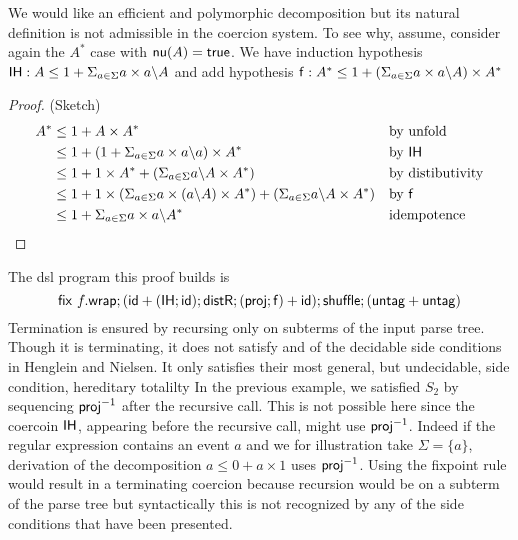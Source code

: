 We would like an efficient and polymorphic decomposition but its natural definition is not admissible in the coercion system. To see why, assume, consider again the $A^*$ case with $\mathsf{nu}(A) = \mathsf{true}$. We have induction hypothesis $\mathsf{IH} : A \leq 1 + \Sigma_{a \in \Sigma} a\times a \backslash A$ and add hypothesis $\mathsf{f} : A^* \leq 1 + (\Sigma_{a \in \Sigma} a\times a \backslash A) \times A^*$
\begin{proof} (Sketch)
\begin{align}
A^* &\leq  1 + A \times A^* && \text{by unfold}\\
 &\leq 1 + (1 + \Sigma_{a \in \Sigma} a\times a \backslash a) \times A^* && \text{by } \mathsf{IH}\\
 &\leq 1 + 1 \times A^* + (\Sigma_{a \in \Sigma} a \backslash A \times A^*) && \text{by distibutivity}\\
 &\leq 1 +  1 \times (\Sigma_{a \in \Sigma} a\times (a \backslash A)\times A^*) +  (\Sigma_{a \in \Sigma} a \backslash A \times A^*)  && \text{by } \mathsf{f}  \\
 &\leq 1 + \Sigma_{a \in \Sigma} a\times a \backslash A^* && \text{idempotence} 
\end{align}
\end{proof}
The dsl program this proof builds is 
\[ \mathsf{fix} ~f.\mathsf{wrap};(\mathsf{id} + (\mathsf{IH};\mathsf{id});\mathsf{distR};(\mathsf{proj};\mathsf{f})+\mathsf{id});\mathsf{shuffle};(\mathsf{untag} + \mathsf{untag}) \]
Termination is ensured by recursing only on subterms of the input parse tree. Though it is terminating, it does not satisfy and of the decidable side conditions in Henglein and Nielsen. It only satisfies their most general, but undecidable, side condition, hereditary totalilty
In the previous example, we satisfied $S_2$ by sequencing $\mathsf{proj}^{-1}$ after the recursive call. This is not possible here since the coercoin $\mathsf{IH}$, appearing before the recursive call, might use $\mathsf{proj}^{-1}$. Indeed if the regular expression contains an event $a$ and we for illustration take $\Sigma = \{a\}$, derivation of the decomposition $a \leq 0 + a \times 1 $ uses $\mathsf{proj}^{-1}$. Using the fixpoint rule would result in a terminating coercion because recursion would be on a subterm of the parse tree but syntactically this is not recognized by any of the side conditions that have been presented.



